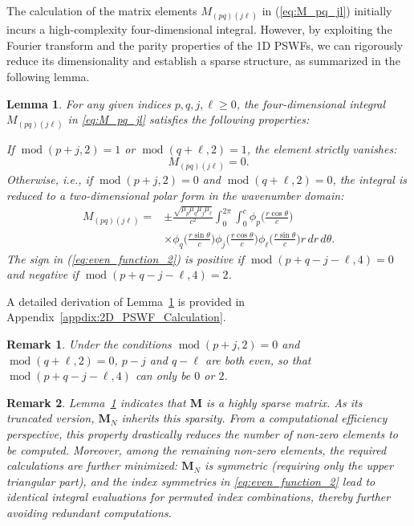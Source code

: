 \documentclass[lettersize,journal]{IEEEtran}
\theoremstyle{plain}
\newtheorem{lemma}{Lemma}
\newtheorem{remark}{Remark}
\begin{document}
The calculation of the matrix elements $M_{(pq)(j\ell)}$ in (\ref{eq:M_pq_jl}) initially incurs a high-complexity four-dimensional integral. However, by exploiting the Fourier transform and the parity properties of the 1D PSWFs, we can rigorously reduce its dimensionality and establish a sparse structure, as summarized in the following lemma.
\begin{lemma}
	\label{lemma:M_pqjl_calculation}
	For any given indices $p, q, j, \ell \geq 0$, the four-dimensional integral $M_{(pq)(j\ell)}$ in \eqref{eq:M_pq_jl} satisfies the following properties:
	
	If $\operatorname{mod}(p+j, 2) = 1$ or $\operatorname{mod}(q+\ell, 2) = 1$, the element strictly vanishes:
	$$
		M_{(pq)(j\ell)} = 0. \label{eq:odd_function_1}
	$$
	Otherwise, i.e., if $\operatorname{mod}(p+j, 2) = 0$ and $\operatorname{mod}(q+\ell, 2) = 0$, the integral is reduced to a two-dimensional polar form in the wavenumber domain:
	\begin{align}
		M_{(pq)(j\ell)} = & \pm\frac{\sqrt{\mu_p\mu_q\mu_j\mu_\ell}}{c^2}\int_{0}^{2\pi}\int_{0}^{c} \phi_p\Big(\frac{r\cos\theta}{c}\Big) \nonumber \\ 
		& \times \phi_q\Big(\frac{r\sin\theta}{c}\Big)\phi_j\Big(\frac{r\cos\theta}{c}\Big)\phi_\ell\Big(\frac{r\sin\theta}{c}\Big)r \, dr \, d\theta.
		\label{eq:even_function_2}
	\end{align}
	The sign in (\ref{eq:even_function_2}) is positive if $\operatorname{mod}(p+q-j-\ell, 4) = 0$ and negative if $\operatorname{mod}(p+q-j-\ell, 4) = 2$. 
\end{lemma}
A detailed derivation of Lemma~\ref{lemma:M_pqjl_calculation} is provided in Appendix~\ref{appdix:2D_PSWF_Calculation}. 
\begin{remark}
	Under the conditions $\operatorname{mod}(p + j, 2) = 0$ and $\operatorname{mod}(q+\ell, 2) = 0$, $p-j$ and $q-\ell$ are both even, so that $\operatorname{mod}(p+q-j-\ell, 4)$ can only be $0$ or $2$.
\end{remark}
\begin{remark}
	Lemma~\ref{lemma:M_pqjl_calculation} indicates that $\mathbf{M}$ is a highly sparse matrix. As its truncated version, $\mathbf{M}_N$ inherits this sparsity. From a computational efficiency perspective, this property drastically reduces the number of non-zero elements to be computed. Moreover, among the remaining non-zero elements, the required calculations are further minimized: $\mathbf{M}_N$ is symmetric (requiring only the upper triangular part), and the index symmetries in \eqref{eq:even_function_2} lead to identical integral evaluations for permuted index combinations, thereby further avoiding redundant computations.
\end{remark}
	
\end{document}
